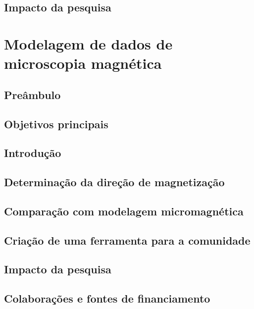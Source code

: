 \documentclass[11pt,a4paper,oneside]{book}
\begin{document}
\section{Impacto da pesquisa}



\chapter{Modelagem de dados de microscopia magnética}

\section{Preâmbulo}

\section{Objetivos principais}

\section{Introdução}

\section{Determinação da direção de magnetização}

\section{Comparação com modelagem micromagnética}

\section{Criação de uma ferramenta para a comunidade}

\section{Impacto da pesquisa}

\section{Colaborações e fontes de financiamento}


\end{document}
